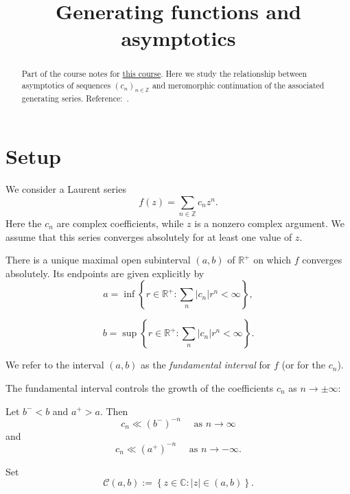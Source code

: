 \documentclass[reqno]{amsart} 
\begin{document}
 
\title{Generating functions and asymptotics}
\begin{abstract}
  Part of the course notes for \href{2023-introduction-to-zeta-and-l-functions.pdf}{this course}.  Here we study the relationship between asymptotics of sequences $(c_n)_{n \in \mathbb{Z}}$ and meromorphic continuation of the associated generating series.  Reference:~\cite[\S5.2]{MR2172781}.
\end{abstract}


\section{Setup}
We consider a Laurent series
\begin{equation*}
  f (z) = \sum_{n \in \mathbb{Z} } c_n z^n.
\end{equation*}
Here the $c_n$ are complex coefficients, while $z$ is a nonzero complex argument.  We assume that this series converges absolutely for at least one value of $z$.

\begin{lemma}\label{lemma:cj3vqafpa6}
  There is a unique maximal open subinterval $(a,b)$ of $\mathbb{R}^+$ on which $f$ converges absolutely.  Its endpoints are given explicitly by
  \begin{equation*}
    a = \inf \left\{ r \in \mathbb{R}^+ : \sum_n \lvert c_n \rvert r^n < \infty  \right\},
  \end{equation*}

\begin{equation*}
  b = \sup \left\{ r \in \mathbb{R}^+ : \sum_n \lvert c_n \rvert r^n < \infty  \right\}.
\end{equation*}
\end{lemma}
We refer to the interval $(a,b)$ as the \emph{fundamental interval} for $f$ (or for the $c_n$).

The fundamental interval controls the growth of the coefficients $c_n$ as $n \rightarrow \pm \infty$:
\begin{lemma}
  Let $b^- < b$ and $a^+ > a$.  Then
  \begin{equation*}
    c_n \ll {(b^-)}^{-n} \quad \text{ as } n \rightarrow \infty
  \end{equation*}
  and
  \begin{equation*}
    c_n \ll {(a^+)}^{-n} \quad \text{ as } n \rightarrow -\infty.
  \end{equation*}
\end{lemma}

Set
\begin{equation*}
  \mathcal{C} (a, b) := \left\{ z \in \mathbb{C} : \lvert z  \rvert \in (a,b) \right\}.
\end{equation*}
\end{document}
